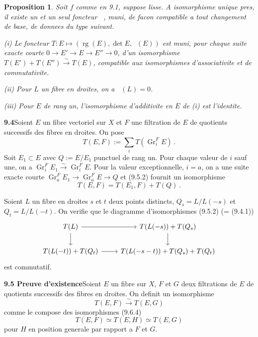 \documentclass[12pt,a4paper]{article}
\theoremstyle{plain}
\newtheorem{proposition}[theorem]{Proposition}
\theoremstyle{definition}
\theoremstyle{remark}
\DeclareMathOperator{\Gr}{Gr}
\DeclareMathOperator{\rg}{rg}
\DeclareMathOperator{\ICtwo}{IC_2}
\newcommand{\simto}{\xrightarrow{\sim}}
\begin{document}
\begin{proposition}
Soit $f$ comme en 9.1, suppose lisse. A isomorphisme unique pres, il existe un et un seul foncteur $\ICtwo$, muni, de facon compatible a tout changement de base, de donnees du type suivant.

\emph{(i)} Le foncteur $T: E \longmapsto (\rg(E), \det E, \ICtwo(E))$ est muni, pour chaque suite exacte courte $0 \to E' \to E \to E'' \to 0$, d'un isomorphisme $T(E') + T(E'') \simto T(E)$, compatible aux isomorphismes d'associativite et de commutativite.

\emph{(ii)} Pour $L$ un fibre en droites, on a $\ICtwo(L) = 0$.

\emph{(iii)} Pour $E$ de rang un, l'isomorphisme d'additivite en $E$ de (i) est l'identite.
\end{proposition}

\medskip
\noindent\textbf{9.4}\quad Soient $E$ un fibre vectoriel sur $X$ et $F$ une filtration de $E$ de quotients successifs des fibres en droites. On pose
\[
T(E, F) := \sum_i T(\Gr_i^F E) \ .
\]
Soit $E_1 \subset E$ avec $Q := E/E_1$ punctuel de rang un. Pour chaque valeur de $i$ sauf une, on a $\Gr_i^F E_1 \simto \Gr_i^F E$. Pour la valeur exceptionnelle, $i = a$, on a une suite exacte courte $\Gr_a^F E_1 \to \Gr_a^F E \to Q$ et (9.5.2) fournit un isomorphisme
\begin{equation}
\label{eq:9.4.1}
T(E, F) = T(E_1, F) + T(Q) \ .
\end{equation}

Soient $L$ un fibre en droites $s$ et $t$ deux points distincts, $Q_s = L/L(-s)$ et $Q_t = L/L(-t)$. On verifie que le diagramme d'isomorphismes (9.5.2) (= (9.4.1))
\begin{equation}
\label{eq:9.4.2}
\begin{tikzcd}
T(L) \arrow[r] \arrow[d] & T(L(-s)) + T(Q_s) \arrow[d] \\
T(L(-t)) + T(Q_t) \arrow[r] & T(L(-s-t)) + T(Q_s) + T(Q_t)
\end{tikzcd}
\end{equation}
est commutatif.

\medskip
\noindent\textbf{9.5 Preuve d'existence}\quad Soient $E$ un fibre sur $X$, $F$ et $G$ deux filtrations de $E$ de quotients successifs des fibres en droites. On definit un isomorphisme
\begin{equation}
\label{eq:9.5.1}
T(E, F) \simto T(E, G)
\end{equation}
comme le compose des isomorphismes (9.6.4)
\[
T(E, F) \simeq T(E, H) \simeq T(E, G)
\]
pour $H$ en position generale par rapport a $F$ et $G$.
\end{document}
